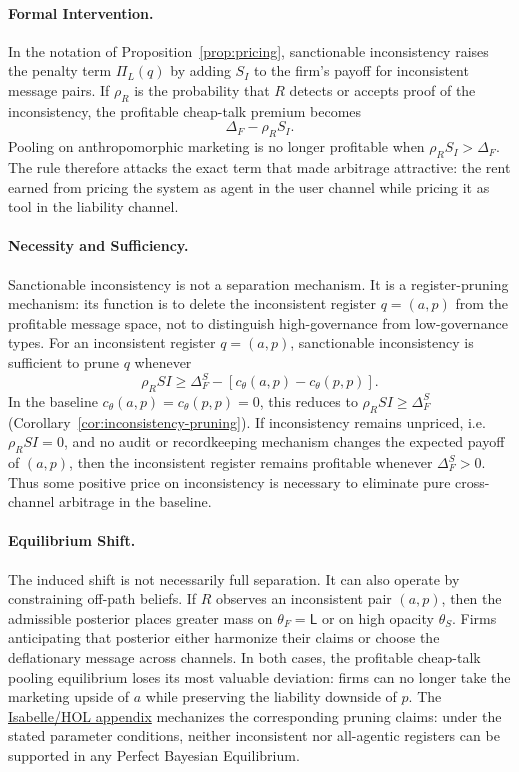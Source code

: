 \documentclass[review,authoryear]{elsarticle}
\theoremstyle{definition}
\theoremstyle{plain}
\begin{document}
\paragraph{Formal Intervention.}
In the notation of Proposition~\ref{prop:pricing}, sanctionable inconsistency
raises the penalty term $\Pi_L(q)$ by adding $S_I$ to the firm's payoff for
inconsistent message pairs.  If $\rho_R$ is the probability that $R$ detects or
accepts proof of the inconsistency, the profitable cheap-talk premium becomes
\[
\Delta_F-\rho_R S_I .
\]
Pooling on anthropomorphic marketing is no longer profitable when
$\rho_R S_I>\Delta_F$.  The rule therefore attacks the exact term that made
arbitrage attractive: the rent earned from pricing the system as agent in the
user channel while pricing it as tool in the liability channel.

\paragraph{Necessity and Sufficiency.}
Sanctionable inconsistency is not a separation mechanism.  It is a
register-pruning mechanism: its function is to delete the inconsistent
register $q=(a,p)$ from the profitable message space, not to distinguish
high-governance from low-governance types.
For an inconsistent register $q=(a,p)$, sanctionable inconsistency is
sufficient to prune $q$ whenever
\[
\rho_R SI \ge \Delta_F^S - [c_\theta(a,p)-c_\theta(p,p)].
\]
In the baseline $c_\theta(a,p)=c_\theta(p,p)=0$, this reduces to
$\rho_R SI \ge \Delta_F^S$
(Corollary~\ref{cor:inconsistency-pruning}).
If inconsistency remains unpriced, i.e.\ $\rho_R SI=0$, and no audit or
recordkeeping mechanism changes the expected payoff of $(a,p)$, then the
inconsistent register remains profitable whenever $\Delta_F^S>0$.
Thus some positive price on inconsistency is necessary to eliminate pure
cross-channel arbitrage in the baseline.

\paragraph{Equilibrium Shift.}
The induced shift is not necessarily full separation. It can also operate by
constraining off-path beliefs. If $R$ observes an inconsistent pair $(a,p)$,
then the admissible posterior places greater mass on $\theta_F=\mathsf{L}$ or
on high opacity $\theta_S$. Firms anticipating that posterior either harmonize
their claims or choose the deflationary message across channels. In both cases,
the profitable cheap-talk pooling equilibrium loses its most valuable deviation: firms can
no longer take the marketing upside of $a$ while preserving the liability
downside of $p$. The \hyperref[app:isabelle]{Isabelle/HOL appendix} mechanizes the corresponding pruning claims: under the stated parameter conditions, neither inconsistent nor all-agentic registers can be supported in any Perfect Bayesian Equilibrium.
\end{document}
